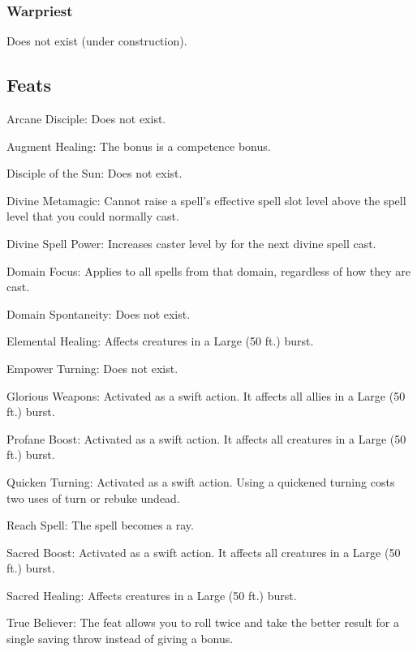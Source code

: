 \subsubsection{Warpriest}
Does not exist (under construction).

\subsection{Feats}
\begin{itemize*}
\item Arcane Disciple: Does not exist.
\item Augment Healing: The bonus is a competence bonus.
\item Disciple of the Sun: Does not exist.
\item Divine Metamagic: Cannot raise a spell's effective spell slot level above the spell level that you could normally cast.
\item Divine Spell Power: Increases caster level by  for the next divine spell cast.
\item Domain Focus: Applies to all spells from that domain, regardless of how they are cast.
\item Domain Spontaneity: Does not exist.
\item Elemental Healing: Affects creatures in a Large (50 ft.) burst.
\item Empower Turning: Does not exist.
\item Glorious Weapons: Activated as a swift action. It affects all allies in a Large (50 ft.) burst.
\item Profane Boost: Activated as a swift action. It affects all creatures in a Large (50 ft.) burst.
\item Quicken Turning: Activated as a swift action. Using a quickened turning costs two uses of turn or rebuke undead.
\item Reach Spell: The spell becomes a ray.
\item Sacred Boost: Activated as a swift action. It affects all creatures in a Large (50 ft.) burst.
\item Sacred Healing: Affects creatures in a Large (50 ft.) burst.
\item True Believer: The feat allows you to roll twice and take the better result for a single saving throw instead of giving a bonus.
\end{itemize*}

